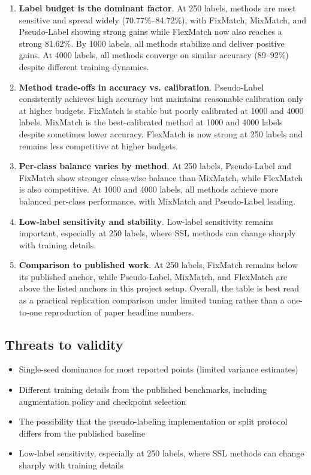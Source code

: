 \begin{enumerate}
    \item \textbf{Label budget is the dominant factor}. At 250 labels, methods are most sensitive and spread widely (70.77\%--84.72\%), with FixMatch, MixMatch, and Pseudo-Label showing strong gains while FlexMatch now also reaches a strong 81.62\%. By 1000 labels, all methods stabilize and deliver positive gains. At 4000 labels, all methods converge on similar accuracy (89--92\%) despite different training dynamics.
    
    \item \textbf{Method trade-offs in accuracy vs. calibration}. Pseudo-Label consistently achieves high accuracy but maintains reasonable calibration only at higher budgets. FixMatch is stable but poorly calibrated at 1000 and 4000 labels. MixMatch is the best-calibrated method at 1000 and 4000 labels despite sometimes lower accuracy. FlexMatch is now strong at 250 labels and remains less competitive at higher budgets.
    
    \item \textbf{Per-class balance varies by method}. At 250 labels, Pseudo-Label and FixMatch show stronger class-wise balance than MixMatch, while FlexMatch is also competitive. At 1000 and 4000 labels, all methods achieve more balanced per-class performance, with MixMatch and Pseudo-Label leading.
    
    \item \textbf{Low-label sensitivity and stability}. Low-label sensitivity remains important, especially at 250 labels, where SSL methods can change sharply with training details.
    
    \item \textbf{Comparison to published work}. At 250 labels, FixMatch remains below its published anchor, while Pseudo-Label, MixMatch, and FlexMatch are above the listed anchors in this project setup. Overall, the table is best read as a practical replication comparison under limited tuning rather than a one-to-one reproduction of paper headline numbers.
\end{enumerate}

\subsection{Threats to validity}

\begin{itemize}
    \item Single-seed dominance for most reported points (limited variance estimates)
    \item Different training details from the published benchmarks, including augmentation policy and checkpoint selection
    \item The possibility that the pseudo-labeling implementation or split protocol differs from the published baseline
    \item Low-label sensitivity, especially at 250 labels, where SSL methods can change sharply with training details
\end{itemize}

